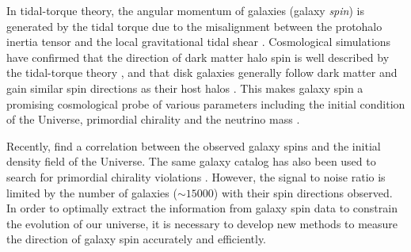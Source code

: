 \documentclass[twocolumn]{aastex631}
\begin{document}
In tidal-torque theory, the angular momentum of galaxies (galaxy \textit{spin}) is generated by the tidal torque due to the misalignment between the protohalo inertia tensor and the local gravitational tidal shear \citep{1969ApJ...155..393P,1970Ap......6..320D,1984ApJ...286...38W}.
Cosmological simulations have confirmed that the direction of dark matter halo spin is well described by the tidal-torque theory \citep{2002MNRAS.332..325P},
and that disk galaxies generally follow dark matter and gain similar spin directions as their host halos \citep{2015ApJ...812...29T,2019MNRAS.488.4801J}.
This makes galaxy spin a promising cosmological probe of various parameters including the initial condition of the Universe, primordial chirality and the neutrino mass \citep[see e.g.][for recent investigations]{2000ApJ...532L...5L,2001ApJ...555..106L,2019PhRvD..99l3532Y,2020PhRvL.124j1302Y,2021NatAs...5..283M,2022PhRvD.105h3512M,2022PhRvD.105h3504M}.

Recently, \citet{2021NatAs...5..283M} find a correlation between the observed galaxy spins and the initial density field of the Universe.
The same galaxy catalog has also been used to search for primordial chirality violations \citep{2022PhRvD.105h3512M}.
However, the signal to noise ratio is limited by the number of galaxies ($\sim15000$) with their spin directions observed.
In order to optimally extract the information from galaxy spin data to constrain the evolution of our universe,
it is necessary to develop new methods to measure the direction of galaxy spin accurately and efficiently.
\end{document}
